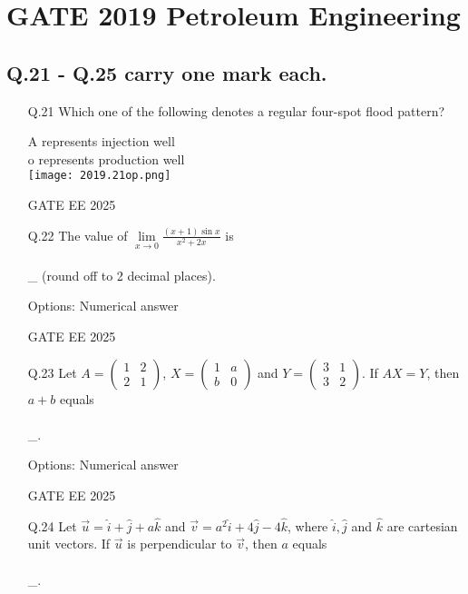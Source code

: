 \documentclass[journal]{IEEEtran}
\begin{document}
\section*{GATE 2019 Petroleum Engineering}

\subsection*{Q.21 - Q.25 carry one mark each.}

\begin{enumerate}[leftmargin=*,series=q]
\setcounter{enumi}{20} %

\item[Q.21] Which one of the following denotes a regular four-spot flood pattern?

\noindent A represents injection well \\
\noindent o represents production well \\

\texttt{[image: 2019.21op.png]}

GATE EE 2025
 \vspace{0.5cm} 
\item[Q.22] The value of $\lim\limits_{x \to 0} \frac{(x+1)\sin x}{x^2 + 2x}$ is \\\\\_ (round off to 2 decimal places).

Options: Numerical answer

GATE EE 2025

\item[Q.23] Let $A = \begin{pmatrix} 1 & 2 \\ 2 & 1 \end{pmatrix}$, $X = \begin{pmatrix} 1 & a \\ b & 0 \end{pmatrix}$ and $Y = \begin{pmatrix} 3 & 1 \\ 3 & 2 \end{pmatrix}$. If $AX = Y$, then $a + b$ equals \\\\\_.

Options: Numerical answer

GATE EE 2025
 \vspace{0.5cm} 
\item[Q.24] Let $\vec{u} = \hat{i} + \hat{j} + a\hat{k}$ and $\vec{v} = a^2\hat{i} + 4\hat{j} - 4\hat{k}$, where $\hat{i}, \hat{j}$ and $\hat{k}$ are cartesian unit vectors. If $\vec{u}$ is perpendicular to $\vec{v}$, then $a$ equals \\\\\_.


\end{enumerate}
\end{document}
